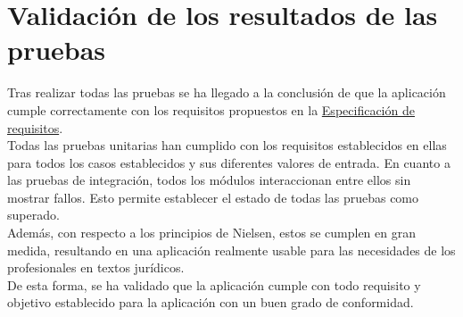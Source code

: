 \section{Validación de los resultados de las pruebas}

Tras realizar todas las pruebas se ha llegado a la conclusión de que la aplicación cumple correctamente con los requisitos propuestos en la \hyperref[enlaceespecificacion]{Especificación de requisitos}.
\\

Todas las pruebas unitarias han cumplido con los requisitos establecidos en ellas para todos los casos establecidos y sus diferentes valores de entrada. En cuanto a las pruebas de integración, todos los módulos interaccionan entre ellos sin mostrar fallos. Esto permite establecer el estado de todas las pruebas como superado.
\\

Además, con respecto a los principios de Nielsen, estos se cumplen en gran medida, resultando en una aplicación realmente usable para las necesidades de los profesionales en textos jurídicos.
\\

De esta forma, se ha validado que la aplicación cumple con todo requisito y objetivo establecido para la aplicación con un buen grado de conformidad.